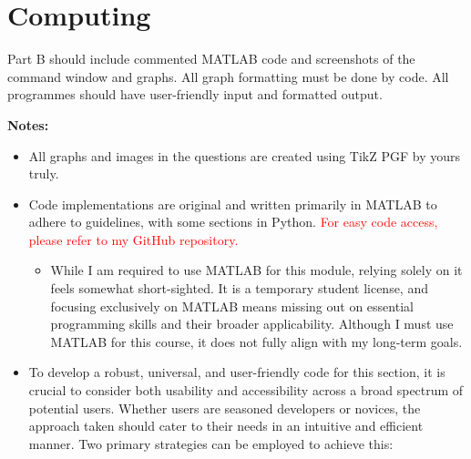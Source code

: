 \documentclass[a4paper, 12pt]{report}
\begin{document}
    \chapter{Computing}    
    \thispagestyle{empty}
    Part B should include commented MATLAB code and
    screenshots of the command window and graphs. All graph formatting must be done by code. All
    programmes should have user-friendly input and formatted output.\\
    \vspace{0.4em}
    \begin{center}
        \Large\textbf{Notes:}
    \end{center}
    \begin{itemize} 
        \item All graphs and images in the questions are created using TikZ PGF by yours truly. 
        \item Code implementations are original and written primarily in MATLAB to adhere to guidelines, with some sections in Python. 
        \textcolor{red}{For easy code access, please refer to my GitHub repository.} 
        \begin{itemize} 
            \item While I am required to use MATLAB for this module, relying solely on it feels somewhat short-sighted. It is a temporary student license, and focusing exclusively on MATLAB means missing out on essential programming skills and their broader applicability. Although I must use MATLAB for this course, it does not fully align with my long-term goals. 
        \end{itemize} 
        \item To develop a robust, universal, and user-friendly code for this section, it is crucial to consider both usability and accessibility across a broad spectrum of potential users. Whether users are seasoned developers or novices, the approach taken should cater to their needs in an intuitive and efficient manner. Two primary strategies can be employed to achieve this:
        

\end{itemize}
\end{document}
